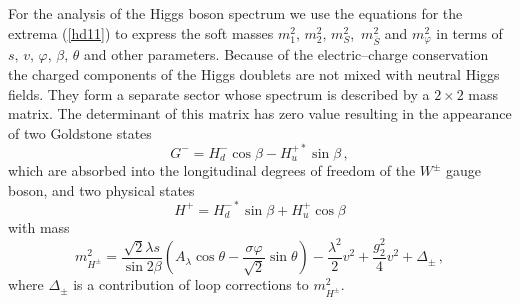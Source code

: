 \documentclass[12pt,a4paper]{article}
\newcommand{\be}{\begin{equation}}
\newcommand{\ee}{\end{equation}}
\begin{document}
For the analysis of the Higgs boson spectrum we use the equations for the extrema (\ref{hd11}) to express the soft masses
$m_1^2,\,m_2^2,\,m_{S}^2$,\, $m_{\overline{S}}^2$ and $m^2_{\varphi}$ in terms of $s,\,v,\,\varphi,\, \beta,\, \theta$
and other parameters. Because of the electric--charge conservation the charged components of the Higgs doublets are not
mixed with neutral Higgs fields. They form a separate sector whose spectrum is described by a $2\times 2$ mass matrix.
The determinant of this matrix has zero value resulting in the appearance of two Goldstone states
\be
G^{-}=H_d^{-}\cos\beta-H_u^{+*}\sin\beta\,,
\label{hd13}
\ee
which are absorbed into the longitudinal degrees of freedom of the $W^{\pm}$ gauge boson, and two physical states
\be
H^{+}=H_d^{-*}\sin\beta+H_u^{+}\cos\beta
\label{hd14}
\ee
with mass
\be
m^2_{H^{\pm}}=\dfrac{\sqrt{2}\lambda s}{\sin 2\beta}\left(A_{\lambda} \cos\theta - \dfrac{\sigma \varphi}{\sqrt{2}}\sin\theta\right)
-\frac{\lambda^2}{2}v^2+\frac{g_2^2}{4}v^2+\Delta_{\pm}\,,
\label{hd15}
\ee
where $\Delta_{\pm}$ is a contribution of loop corrections to $m^2_{H^{\pm}}$.
\end{document}
